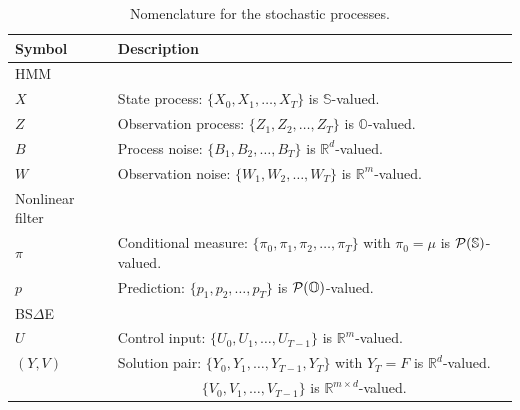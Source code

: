 \documentclass[twoside,11pt]{article}
\def\Re{\mathbb{R}}
\newcommand{\field}[1]{\mathbb{#1}}
\def\Re{\field{R}}
\def\clP{{\cal P}}
\def\bS{\begin{slide}}
\def\Re{\mathbb{R}}
\def\clY{{\cal Y}}
\def\clP{{\cal P}}
\renewcommand{\Re}{\mathbb{R}}
\def\clN{{\cal N}}
\def\clP{{\cal P}}
\def\clU{{\cal U}}
\def\clY{{\cal Y}}
\def\bS{\mathbb{S}}
\def\bO{\mathbb{O}}
\def\dfltr{{\text{\rm (dfltr)}}}
\begin{document}


\begin{table}[t]
  \begin{tabularx}{\textwidth}{l l}
    \toprule
    Symbol & Description \\
    \midrule
    HMM &\\
    $X$ & State process: $\{X_0,X_1,\hdots,X_T\}$ is $\bS$-valued. \\
    $Z$ & Observation process: $\{Z_1,Z_2,\hdots,Z_T\}$ is $\bO$-valued.\\
    $B$ & Process noise: $\{B_1,B_2,\hdots,B_T\}$ is
          $\Re^d$-valued.\\
        $W$ & Observation noise: $\{W_1,W_2,\hdots,W_T\}$ is $\Re^m$-valued.\\
    \midrule
    Nonlinear filter &\\
    $\pi$ & Conditional measure:
            $\{\pi_0,\pi_1,\pi_2,\hdots,\pi_T\}$ with $\pi_0=\mu$ is $\clP(\bS)$-valued. \\
    $p$ & Prediction: $\{p_1,p_2,\hdots,p_T\}$ is $\clP(\bO)$-valued.
    \\
        \midrule
    BS$\Delta$E &\\
    $U$ & Control input: $\{U_0,U_1,\hdots,U_{T-1}\}$ is
          $\Re^m$-valued.\\
    $(Y,V)$ & Solution pair: $\{Y_0,Y_1,\hdots,Y_{T-1},Y_T\}$ with $Y_T=F$ is
              $\Re^d$-valued.\\
    & $\qquad \qquad \qquad \{V_0,V_1,\hdots,V_{T-1}\}$ is
              $\Re^{m\times d}$-valued.\\
    \bottomrule
  \end{tabularx}
  \vspace*{-10pt}
  \caption{Nomenclature for the stochastic processes.}
  \label{tab:nomenclature_sp}
  \vspace*{-10pt}
\end{table}
\end{document}
